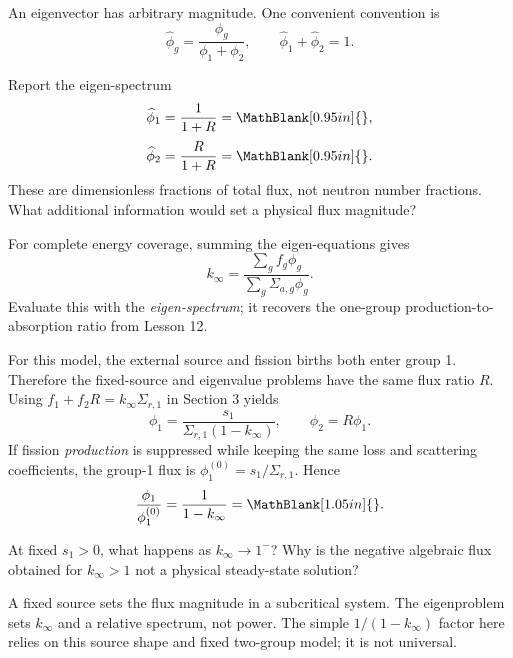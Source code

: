 \begin{handoutcolumns}
\switchcolumn
\RaggedRight
{}
An eigenvector has arbitrary magnitude. One convenient convention is
\[
 \widehat\phi_g=\frac{\phi_g}{\phi_1+\phi_2},
 \qquad \widehat\phi_1+\widehat\phi_2=1.
\]
\begin{boardbox}{Report the eigen-spectrum}
\[
 \widehat\phi_1=\frac{1}{1+R}
   =\MathBlank[0.95in]{},
\]
\[
 \widehat\phi_2=\frac{R}{1+R}
   =\MathBlank[0.95in]{}.
\]
These are dimensionless fractions of total flux, not neutron
number fractions. What additional information would set a
physical flux magnitude?
\end{boardbox}
For complete energy coverage, summing the eigen-equations gives
\[
 \boxed{k_{\infty}=
 \frac{\sum_g f_g\phi_g}{\sum_g\Sigma_{a,g}\phi_g}}.
\]
Evaluate this with the \emph{eigen-spectrum}; it recovers the
one-group production-to-absorption ratio from Lesson 12.

For this model, the external source and fission births both enter
group 1. Therefore the fixed-source and eigenvalue problems have
the same flux ratio $R$.
Using $f_1+f_2R=k_{\infty}\Sigma_{r,1}$ in Section 3 yields
\[
 \boxed{\phi_1=\frac{s_1}{\Sigma_{r,1}(1-k_{\infty})}},
 \qquad \phi_2=R\phi_1.
\]
If fission \emph{production} is suppressed while keeping the
same loss and scattering coefficients, the group-1 flux is
$\phi_1^{(0)}=s_1/\Sigma_{r,1}$. Hence
\[
 \frac{\phi_1}{\phi_1^{(0)}}=\frac1{1-k_{\infty}}
 =\MathBlank[1.05in]{}.
\]
\begin{checkpoint}
At fixed $s_1>0$, what happens as $k_{\infty}\to1^{-}$?
Why is the negative algebraic flux obtained for $k_{\infty}>1$
not a physical steady-state solution?
\end{checkpoint}
\begin{takeawaybox}
A fixed source sets the flux magnitude in a subcritical system.
The eigenproblem sets $k_{\infty}$ and a relative spectrum, not
power. The simple $1/(1-k_{\infty})$ factor here relies on this
source shape and fixed two-group model; it is not universal.
\end{takeawaybox}
\end{handoutcolumns}

